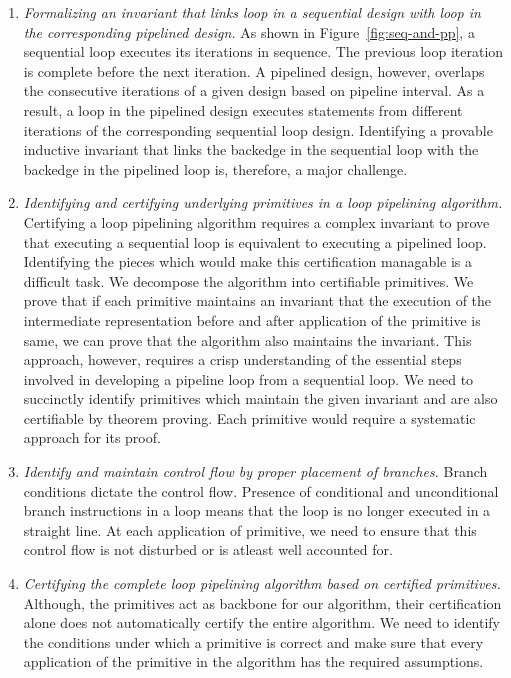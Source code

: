 \begin{enumerate}[--]
\item {\em Formalizing an invariant that links loop in a sequential design with loop in the corresponding pipelined design.} As shown in Figure~\ref{fig:seq-and-pp}, a sequential loop executes its iterations in sequence. The previous loop iteration is complete before the next iteration. A pipelined design, however, overlaps the consecutive iterations of a given design based on pipeline interval. As a result, a loop in the pipelined design executes statements from different iterations of the corresponding sequential loop design. Identifying a provable inductive invariant that links the backedge in the sequential loop with the backedge in the pipelined loop is, therefore, a major challenge.
\item {\em Identifying and certifying underlying primitives in a loop pipelining algorithm.} Certifying a loop pipelining algorithm requires a complex invariant to prove that executing a sequential loop is equivalent to executing a pipelined loop. Identifying the pieces which would make this certification managable is a difficult task. We decompose the algorithm into certifiable primitives. We prove that if each primitive maintains an invariant that the execution of the intermediate representation before and after application of the primitive is same, we can prove that the algorithm also maintains the invariant. This approach, however, requires a crisp understanding of the essential steps involved in developing a pipeline loop from a sequential loop. We need to succinctly identify primitives which maintain the given invariant and are also certifiable by theorem proving. Each primitive would require a systematic approach for its proof.
\item {\em Identify and maintain control flow by proper placement of branches.}  Branch conditions dictate the control flow. Presence of conditional and unconditional branch instructions in a loop means that the loop is no longer executed in a straight line. At each application of primitive, we need to ensure that this control flow is not disturbed or is atleast well accounted for. 
\item {\em Certifying the complete loop pipelining algorithm based on certified primitives.} Although, the primitives act as backbone for our algorithm, their certification alone does not automatically certify the entire algorithm. We need to identify the conditions under which a primitive is correct and make sure that every application of the primitive in the algorithm has the required assumptions.
\end{enumerate}

